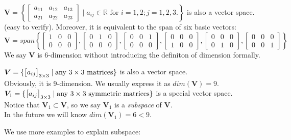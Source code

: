 \begin{example}
$\bm V = \left\{\begin{bmatrix}
a_{11}&a_{12}&a_{13}\\a_{21}&a_{22}&a_{23}
\end{bmatrix}\mid a_{ij}\in\mathbb{R}\text{ for $i=1,2; j=1,2,3.$}\right\}$ is also a vector space. (easy to verify). Moreover, it is equivalent to the span of six basic vectors:\\
\[
\bm V = span\left\{
\begin{bmatrix}
1&0&0\\0&0&0
\end{bmatrix},\begin{bmatrix}
0&1&0\\0&0&0
\end{bmatrix},\begin{bmatrix}
0&0&1\\0&0&0
\end{bmatrix},\begin{bmatrix}
0&0&0\\1&0&0
\end{bmatrix},\begin{bmatrix}
0&0&0\\0&1&0
\end{bmatrix},\begin{bmatrix}
0&0&0\\0&0&1
\end{bmatrix}
\right\}
\]
We say $\bm V$ is 6-dimension without introducing the definiton of dimension formally.
\end{example}
\begin{example}
$\bm V = \{\begin{bmatrix}
a_{ij}
\end{bmatrix}_{3\times 3}\mid \text{any $3\times 3$ matrices}\}$ is also a vector space.\\ Obviously, it is 9-dimension. We usually express it as $dim(\bm V) = 9$.\\$\bm V_1 = \{\begin{bmatrix}
a_{ij}
\end{bmatrix}_{3\times 3}\mid \text{any $3\times 3$ symmetric matrices}\}$ is a special vector space. \\Notice that $\bm V_1\subset\bm V$, so we say $\bm V_1$ is a \textit{subspace} of $\bm V$.\\
In the future we will know $dim(\bm V_1) = 6<9$.
\end{example}
We use more examples to explain subspace:
